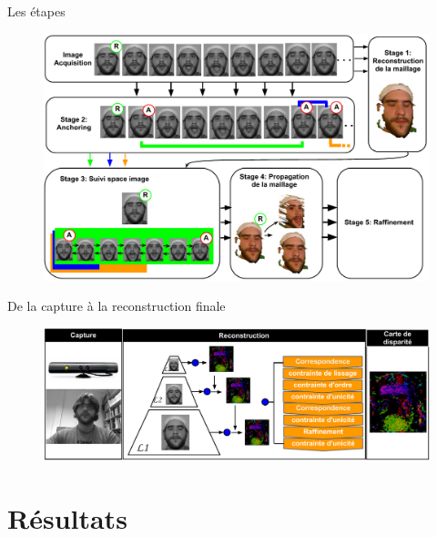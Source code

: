 \documentclass[compress,pdf,11pt,xcolor=dvipsnames]{beamer}
\begin{document}
\begin{frame}{Les étapes}
\begin{figure}[ht!]
  \begin{center}
    \includegraphics[width=\textwidth]{img/projDiagram}
  \end{center}
\end{figure}
\end{frame}


\begin{frame}{De la capture à la reconstruction finale}
\begin{figure}[ht!]
    \includegraphics[width=\textwidth]{img/projSystem}
\end{figure}
\end{frame}

\section{Résultats}
\end{document}

